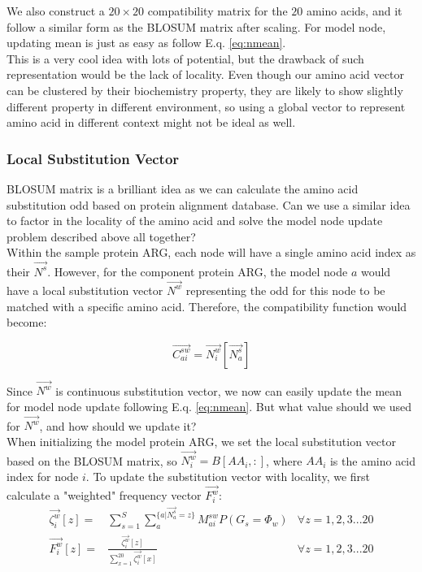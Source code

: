 We also construct a $20\times 20$ compatibility matrix for the $20$ amino acids, and it follow a similar form as the BLOSUM matrix after scaling. For model node, updating mean is  just as easy as follow E.q. \ref{eq:nmean}.\\

This is a very cool idea with lots of potential, but the drawback of such representation would be the lack of locality. Even though our amino acid vector can be clustered by their biochemistry property, they are likely to show slightly different property in different environment, so using a global vector to represent amino acid in different context might not be ideal as well. 

\subsubsection{Local Substitution Vector}

BLOSUM matrix is a brilliant idea as we can calculate the amino acid substitution odd based on protein alignment database. Can we use a similar idea to factor in the locality of the amino acid and solve the model node update problem described above all together?\\

Within the sample protein ARG, each node will have a single amino acid index as their $\overrightarrow{N^s}$. However, for the component protein ARG, the model node $a$ would have a local substitution vector $\overrightarrow{N^w}$ representing the odd for this node to be matched with a specific amino acid. Therefore, the compatibility function would become:

\begin{equation} 
\overrightarrow{C_{ai}^{sw}}=\overrightarrow{N^w_i}[\overrightarrow{N^s_a}]
\end{equation}

Since $\overrightarrow{N^w}$ is continuous substitution vector, we now can easily update the mean for model node update following E.q. \ref{eq:nmean}. But what value should we used for $\overrightarrow{N^w}$, and how should we update it?\\

When initializing the model protein ARG, we set the local substitution vector based on the BLOSUM matrix, so $\overrightarrow{N^w_i}=B[AA_i,:]$, where $AA_i$ is the amino acid index for node $i$. To update the substitution vector with locality, we first calculate a "weighted" frequency vector $\overrightarrow{F^w_i}$:
\begin{align} 
\overrightarrow{\zeta^w_i}[z] = & \sum^{S}_{s=1}\sum^{\{a|\overrightarrow{N^s_a}=z\}}_{a}M^{sw}_{ai}P(G_s=\Phi_w) & \forall z=1,2,3...20\\
\overrightarrow{F^w_i}[z] = & \frac{\overrightarrow{\zeta^w_i}[z]}{\sum^{20}_{x=1}\overrightarrow{\zeta^w_i}[x]} & \forall z=1,2,3...20
\end{align}

